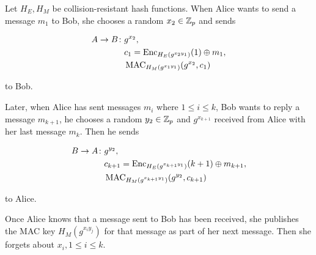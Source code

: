 \begin{protocol}\label{prot:otrcomm}
  Let \(H_E, H_M\) be collision-resistant hash functions.
  When Alice wants to send a message \(m_1\) to Bob, she chooses a random 
  \(x_{2}\in\mathbb Z_{p}\) and sends
  \begin{frame}
    \begin{align*}
      A\to B\colon &g^{x_2}, \\
      &c_1 = \operatorname{\mathrm{Enc}}_{H_E( g^{x_2 y_1} )}( 1 )\oplus m_1, \\
      &\operatorname{\mathrm{MAC}}_{H_M( g^{x_1 y_1} )}( g^{x_2}, c_1 )
    \end{align*}
  \end{frame}
  to Bob.

  Later, when Alice has sent messages \(m_i\) where \(1\leq i\leq k\), Bob 
  wants to reply a message \(m_{k+1}\), he chooses a random \(y_2\in\mathbb Z_p\) and 
  \(g^{x_{k+1}}\) received from Alice with her last message \(m_k\).
  Then he sends
  \begin{frame}
  \begin{align*}
    B\to A\colon & g^{y_2}, \\
    & c_{k+1} = \operatorname{\mathrm{Enc}}_{H_E( g^{x_{k+1} y_1} )}( k+1 )\oplus m_{k+1}, \\
    & \operatorname{\mathrm{MAC}}_{H_M( g^{x_{k+1} y_1} )}( g^{y_2}, c_{k+1} )
  \end{align*}
  \end{frame}
  to Alice.

  Once Alice knows that a message sent to Bob has been received, she publishes 
  the \ac{MAC} key \( H_M( g^{x_i y_j} ) \) for that message as part of her 
  next message.
  Then she forgets about \(x_i, 1\leq i\leq k\).
\end{protocol}

